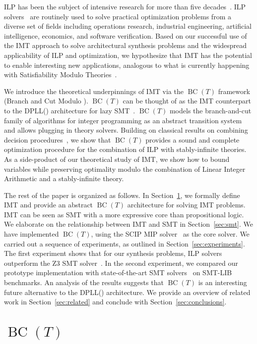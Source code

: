 \documentclass{llncs}
\newcommand{\bct}[0]{\ensuremath{\operatorname{BC}(T)}}
\newcommand{\dpllt}[0]{DPLL()}
\begin{document}
ILP has been the subject of intensive research for more than five
decades~\cite{gomory63}. ILP solvers~\cite{cplex,scip} are routinely
used to solve practical optimization problems from a diverse set of
fields including operations research, industrial engineering,
artificial intelligence, economics, and software verification. Based
on our successful use of the IMT approach to solve architectural
synthesis problems and the widespread applicability of ILP and
optimization, we hypothesize that IMT has the potential to enable
interesting new applications, analogous to what is currently happening
with Satisfiability Modulo
Theories~\cite{barrett02,demoura02,dpllt,z3}.

We introduce the theoretical underpinnings of IMT via the \bct{}
framework (Branch and Cut Modulo ). \bct{} can be thought of as the
IMT counterpart to the \dpllt{} architecture for lazy
SMT~\cite{dpllt}. \bct{} models the branch-and-cut family of
algorithms for integer programming as an abstract transition system
and allows plugging in theory solvers. Building on classical results
on combining decision procedures~\cite{no79,noproof,combiningdp}, we
show that \bct{} provides a sound and complete optimization procedure
for the combination of ILP with stably-infinite theories. As a
side-product of our theoretical study of IMT, we show how to bound
variables while preserving optimality modulo the combination of Linear
Integer Arithmetic and a stably-infinite theory.

The rest of the paper is organized as follows. In
Section~\ref{sec:bct}, we formally define IMT and provide an abstract
\bct{} architecture for solving IMT problems. IMT can be seen as SMT
with a more expressive core than propositional logic.  We elaborate on
the relationship between IMT and SMT in Section~\ref{sec:smt}.  We
have implemented \bct{}, using the SCIP MIP solver~\cite{scip} as the
core solver. We carried out a sequence of experiments, as outlined in
Section~\ref{sec:experiments}. The first experiment shows that for our
synthesis problems, ILP solvers~\cite{cplex,scip} outperform the Z3
SMT solver~\cite{z3}.  In the second experiment, we compared our
prototype implementation with state-of-the-art SMT
solvers~\cite{z3,mathsatlia} on SMT-LIB benchmarks. An analysis of the
results suggests that \bct{} is an interesting future alternative to
the \dpllt{} architecture.  We provide an overview of related work in
Section~\ref{sec:related} and conclude with
Section~\ref{sec:conclusions}.

\section{\bct{}}
\label{sec:bct}
\end{document}
